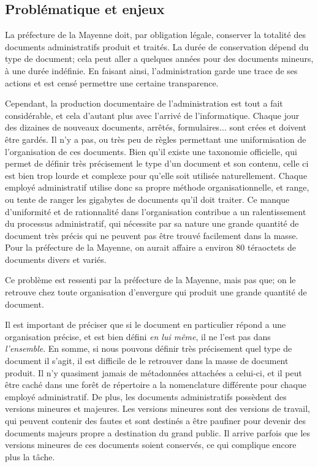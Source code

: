\subsection {Problématique et enjeux}
La préfecture de la Mayenne doit, par obligation légale, conserver la totalité des documents administratifs produit et traités. La durée de conservation dépend du type de document; cela peut aller a quelques années pour des documents mineurs, à une durée indéfinie. En faisant ainsi, l'administration garde une trace de ses actions et est censé permettre une certaine transparence. 

Cependant, la production documentaire de l'administration est tout a fait considérable, et cela d'autant plus avec l'arrivé de l'informatique. Chaque jour des dizaines de nouveaux documents, arrêtés, formulaires... sont crées et doivent être gardés. Il n'y a pas, ou très peu de règles permettant une uniformisation de l'organisation de ces documents. Bien qu'il existe une taxonomie officielle, qui permet de définir très précisement le type d'un document et son contenu, celle ci est bien trop lourde et complexe pour qu'elle soit utilisée naturellement. Chaque employé administratif utilise donc sa propre méthode organisationnelle, et range, ou tente de ranger les gigabytes de documents qu'il doit traiter. Ce manque d'uniformité et de rationnalité dans l'organisation contribue a un ralentissement du processus administratif, qui nécessite par sa nature une grande quantité de document très précis qui ne peuvent pas être trouvé facilement dans la masse. Pour la préfecture de la Mayenne, on aurait affaire a environ 80 téraoctets de documents divers et variés. 

Ce problème est ressenti par la préfecture de la Mayenne, mais pas que; on le retrouve chez toute organisation d'envergure qui produit une grande quantité de document. 

Il est important de préciser que si le document en particulier répond a une organisation précise, et est bien défini \textit{en lui même}, il ne l'est pas dans \textit{l'ensemble}. En somme, si nous pouvons définir très précisement quel type de document il s'agit, il est difficile de le retrouver dans la masse de document produit. Il n'y quasiment jamais de métadonnées attachées a celui-ci, et il peut être caché dans une forêt de répertoire a la nomenclature différente pour chaque employé administratif. De plus, les documents administratifs possèdent des versions mineures et majeures. Les versions mineures sont des versions de travail, qui peuvent contenir des fautes et sont destinés a être paufiner pour devenir des documents majeurs propre a destination du grand public. Il arrive parfois que les versions mineures de ces documents soient conservés, ce qui complique encore plus la tâche.

